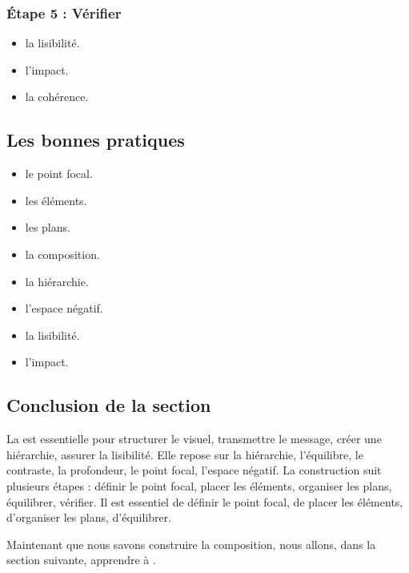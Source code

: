 \subsubsection{Étape 5 : Vérifier}

\begin{itemize}
    \item {} la lisibilité.
    \item {} l'impact.
    \item {} la cohérence.
\end{itemize}

\subsection{Les bonnes pratiques}

\begin{itemize}
    \item {} le point focal.
    \item {} les éléments.
    \item {} les plans.
    \item {} la composition.
    \item {} la hiérarchie.
    \item {} l'espace négatif.
    \item {} la lisibilité.
    \item {} l'impact.
\end{itemize}

\subsection*{Conclusion de la section}

La  est essentielle pour structurer le visuel, transmettre le message, créer une hiérarchie, assurer la lisibilité. Elle repose sur la hiérarchie, l'équilibre, le contraste, la profondeur, le point focal, l'espace négatif. La construction suit plusieurs étapes : définir le point focal, placer les éléments, organiser les plans, équilibrer, vérifier. Il est essentiel de définir le point focal, de placer les éléments, d'organiser les plans, d'équilibrer.

Maintenant que nous savons construire la composition, nous allons, dans la section suivante, apprendre à .

